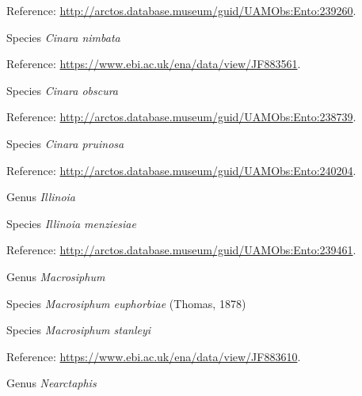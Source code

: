 \documentclass[9pt, article]{memoir}
\begin{document}
\begin{multicols}{2}
\vspace{6pt}Reference: 
\url{http://arctos.database.museum/guid/UAMObs:Ento:239260}.

\vspace{6pt}\noindent\hspace{36pt}Species \textit{Cinara nimbata}


\vspace{6pt}Reference: 
\url{https://www.ebi.ac.uk/ena/data/view/JF883561}.

\vspace{6pt}\noindent\hspace{36pt}Species \textit{Cinara obscura}


\vspace{6pt}Reference: 
\url{http://arctos.database.museum/guid/UAMObs:Ento:238739}.

\vspace{6pt}\noindent\hspace{36pt}Species \textit{Cinara pruinosa}


\vspace{6pt}Reference: 
\url{http://arctos.database.museum/guid/UAMObs:Ento:240204}.

\vspace{6pt}\noindent\hspace{30pt}Genus \textit{Illinoia}


\vspace{6pt}\noindent\hspace{36pt}Species \textit{Illinoia menziesiae}


\vspace{6pt}Reference: 
\url{http://arctos.database.museum/guid/UAMObs:Ento:239461}.

\vspace{6pt}\noindent\hspace{30pt}Genus \textit{Macrosiphum}


\vspace{6pt}\noindent\hspace{36pt}Species \textit{Macrosiphum euphorbiae} (Thomas, 1878)


\vspace{6pt}\noindent\hspace{36pt}Species \textit{Macrosiphum stanleyi}


\vspace{6pt}Reference: 
\url{https://www.ebi.ac.uk/ena/data/view/JF883610}.

\vspace{6pt}\noindent\hspace{30pt}Genus \textit{Nearctaphis}



\end{multicols}
\end{document}
